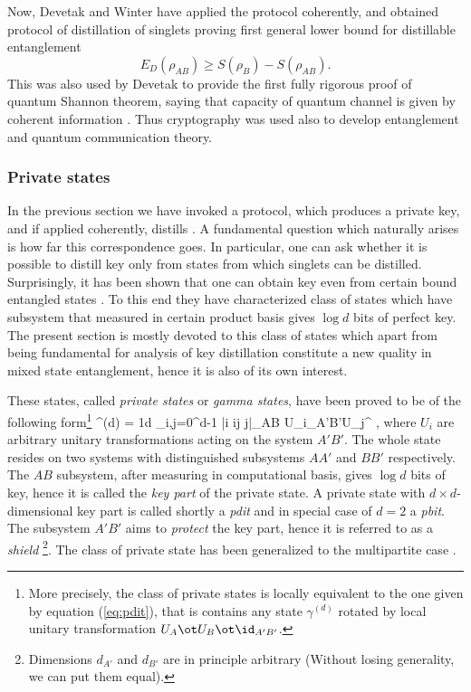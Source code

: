 \documentclass[twocolumn,aps,rmp]{revtex4}
\begin{document}
Now, Devetak and Winter have applied the protocol coherently, and
obtained protocol of distillation of singlets proving first general
lower bound for distillable entanglement \begin{equation} E_D(\rho_{AB})\geq S(\rho_B)- S(\rho_{AB}). \end{equation}
This was also used by Devetak to provide the first fully rigorous
proof of quantum Shannon theorem, saying that capacity of quantum
channel is given by coherent information \cite{Devetak2003}.
Thus cryptography was used also to develop entanglement and
quantum communication theory.

\subsubsection{Private states}
\label{subsubsec:private} In the previous section we have invoked a
protocol, which produces a private key, and if applied coherently,
distills \singlets. A fundamental question which naturally arises is
how far this correspondence goes. In particular, one can ask whether
it is possible to distill key only from states from which singlets
can be distilled. Surprisingly,  it has been shown that one can
obtain key even from certain bound entangled states
\cite{pptkey,keyhuge}.
To this end they have characterized
class of states which have subsystem that measured in certain
product basis gives $\log d$ bits of perfect key. The present section is mostly devoted to this class of states which apart from being fundamental for analysis of key distillation constitute a new quality in mixed state entanglement, hence it is also of its own interest.

These states, called {\it private states} or {\it gamma states},
have been proved to be of the following form\footnote{
More precisely, the class of private states is locally equivalent to the one
given by equation (\ref{eq:pdit}), that is contains any state $\gamma^{(d)}$ rotated by local unitary transformation $U_A\ot U_B \ot \id_{A'B'}$.} \be \gamma^{(d)} =
{1\over d} \sum_{i,j=0}^{d-1} |i i\>\<j j|_{AB}\ot
U_{i}\rho_{A'B'}U_{j}^{\dagger} \label{eq:pdit}, \ee where $U_i$
are arbitrary unitary transformations acting on the system $A'B'$.
The whole state resides on two systems with distinguished subsystems $A A'$ and $BB'$ respectively. The $AB$ subsystem, after measuring in
computational basis, gives $\log d$ bits of key, hence it is called
the {\it key part} of the private state. A private state with
$d\times d$-dimensional key part is called shortly a {\it pdit} and
in special case of $d=2$ a {\it pbit}. The subsystem $A'B'$ aims to
{\it protect} the key part, hence it is referred to as a {\it
shield} {}\footnote{Dimensions $d_{A'}$ and $d_{B'}$ are in
principle arbitrary (Without losing generality, we can put them
equal).}. The class of private state has been generalized
to the multipartite case \cite{AH-pditdist}.
\end{document}
